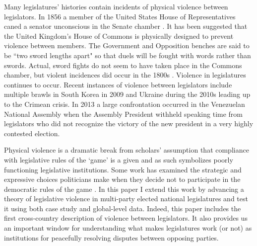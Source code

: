 \documentclass[a4paper]{article}\usepackage[]{graphicx}\usepackage[]{color}
\begin{document}
Many legislatures' histories contain incidents of physical violence between legislators. In 1856 a member of the United States House of Representatives caned a senator unconscious in the Senate chamber \citep{USSenateCanning}. It has been suggested that the United Kingdom's House of Commons is physically designed to prevent violence between members. The Government and Opposition benches are said to be ``two sword lengths apart" \citep{ParliamentUKSword} so that duels will be fought with words rather than swords. Actual, sword fights do not seem to have taken place in the Commons chamber, but violent incidences did occur in the 1800s \citep[see][]{ByrneViolence}. Violence in legislatures continues to occur. Recent instances of violence between legislators include multiple brawls in South Korea in 2009 and Ukraine during the 2010s leading up to the Crimean crisis. In 2013 a large confrontation occurred in the Venezuelan National Assembly when the Assembly President withheld speaking time from legislators who did not recognize the victory of the new president in a very highly contested election.

Physical violence is a dramatic break from scholars' assumption that compliance with legislative rules of the `game' is a given and as such symbolizes poorly functioning legislative institutions. Some work has examined the strategic and expressive choices politicians make when they decide not to participate in the democratic rules of the game \citep{wilkinson2006,Beaulieu2008,BeaulieuForthcoming}. In this paper I extend this work by advancing a theory of legislative violence in multi-party elected national legislatures and test it using both case study and global-level data. Indeed, this paper includes the first cross-country description of violence between legislators. It also provides us an important window for understanding what makes legislatures work (or not) as institutions for peacefully resolving disputes between opposing parties.
\end{document}
